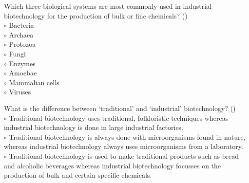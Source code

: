 \documentclass[]{beamer}
\begin{document}
\begin{CJK}{UTF8}{gbsn}
\begin{frame}[shrink] {} 
\addtocounter{questions}{1}
\color{blue}
  Which three biological systems are most commonly used in industrial biotechnology for the production of bulk or fine chemicals? 
 ({})\\
\color{black}
\setlength{\parindent}{-0.4cm}
{\color{red}$\circ$}  Bacteria   \\
{\color{red}$\circ$} Archaea   \\
{\color{red}$\circ$} Protozoa  \\
{\color{red}$\circ$}  Fungi  \\
{\color{red}$\circ$}  Enzymes  \\
{\color{red}$\circ$} Amoebae  \\
{\color{red}$\circ$} Mammalian cells  \\
{\color{red}$\circ$} Viruses  \\
\end{frame}


\begin{frame}[shrink] {} 
\addtocounter{questions}{1}
\color{blue}
  What is the difference between ‘traditional’ and ‘industrial’ biotechnology?
 ({})\\
\color{black}
\setlength{\parindent}{-0.4cm}
{\color{red}$\circ$} Traditional biotechnology uses traditional, folkloristic techniques whereas industrial biotechnology is done in large industrial factories.  \\
{\color{red}$\circ$} Traditional biotechnology is always done with microorganisms found in nature, whereas industrial biotechnology always uses microorganisms from a laboratory.  \\
{\color{red}$\circ$}  Traditional biotechnology  is used to make traditional products such as bread and alcoholic beverages whereas industrial biotechnology focusses on the production of bulk and certain specific chemicals.  \\
\end{frame}



\end{CJK}
\end{document}
